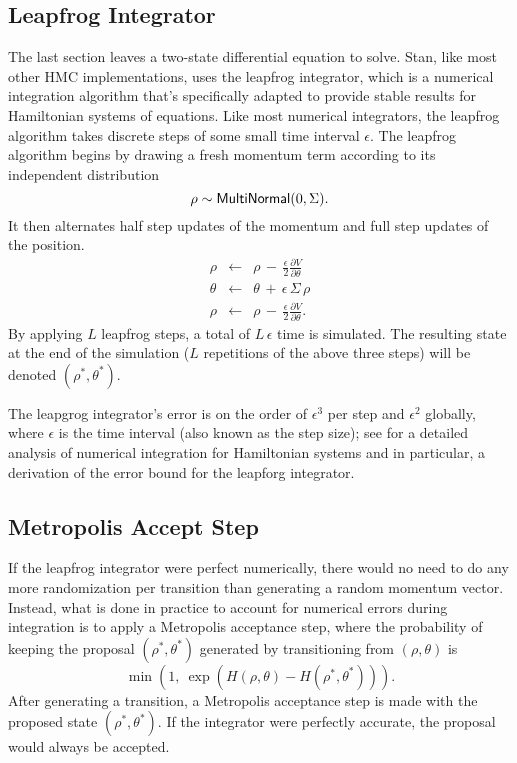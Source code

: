 \subsection{Leapfrog Integrator}

The last section leaves a two-state differential equation to solve.
Stan, like most other HMC implementations, uses the leapfrog
integrator, which is a numerical integration algorithm that's
specifically adapted to provide stable results for Hamiltonian systems
of equations. Like most numerical integrators, the leapfrog algorithm
takes discrete steps of some small time interval $\epsilon$. 
The leapfrog algorithm begins by drawing a fresh momentum term
according to its independent distribution
%
\[
\rho \sim \distro{MultiNormal}(0,\Sigma).
\]
It then alternates half step updates of the momentum and full step
updates of the position.
%
\vspace*{-6pt}
\begin{eqnarray*}
\rho & \leftarrow 
     & \rho \, - \, \frac{\epsilon}{2} \frac{\partial V}{\partial \theta}
\\[6pt]
\theta & \leftarrow
       & \theta \, + \, \epsilon \, \Sigma \, \rho
\\[6pt]
\rho & \leftarrow 
     & \rho \, - \, \frac{\epsilon}{2} \frac{\partial V}{\partial \theta}.
\end{eqnarray*}
%
By applying $L$ leapfrog steps, a total of $L \, \epsilon$ time is
simulated. The resulting state at the end of the simulation ($L$
repetitions of the above three steps) will be denoted
$(\rho^{*},\theta^{*})$.

The leapgrog integrator's error is on the order of $\epsilon^3$ per
step and $\epsilon^2$ globally, where $\epsilon$ is the time interval
(also known as the step size); see \citep{LeimkuhlerReich:2004} for a
detailed analysis of numerical integration for Hamiltonian systems and
in particular, a derivation of the error bound for the leapforg
integrator.


\subsection{Metropolis Accept Step}

If the leapfrog integrator were perfect numerically, there would no
need to do any more randomization per transition than generating a
random momentum vector. Instead, what is done in practice to account
for numerical errors during integration is to apply a Metropolis
acceptance step, where the probability of keeping the proposal 
$(\rho^{*},\theta^{*})$ generated by transitioning from $(\rho,\theta)$ is
\[
\min\!\left(1, \ \exp\!\left( H(\rho,\theta) - H(\rho^{*},\theta^{*})\right)\right).
\]
After generating a transition, a Metropolis acceptance step is made
with the proposed state $(\rho^{*},\theta^{*})$. If the integrator
were perfectly accurate, the proposal would always be accepted. 


